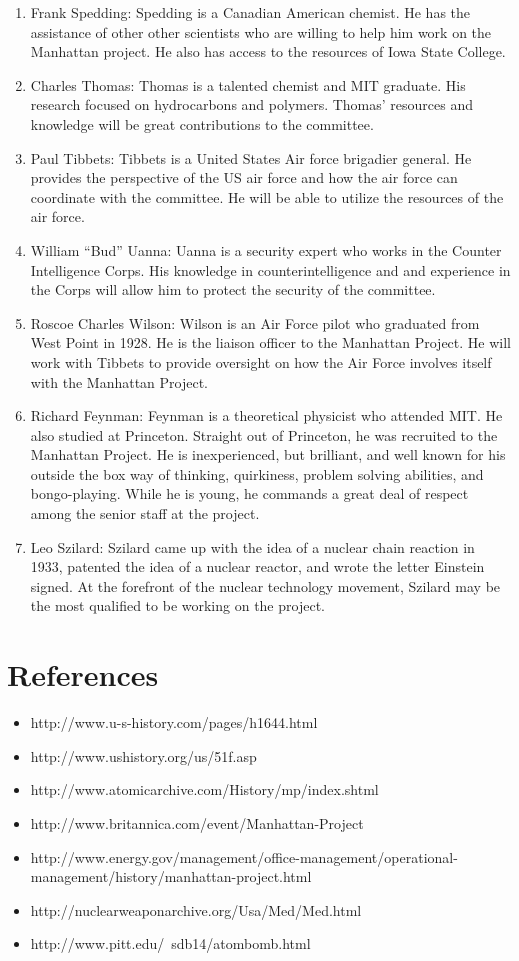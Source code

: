 \documentclass[11 pt, twoside]{article}
\begin{document}
\begin{enumerate}
\item Frank Spedding: Spedding is a Canadian American chemist. He has the assistance of other other scientists who are willing to help him work on the Manhattan project. He also has access to the resources of Iowa State College.
\item Charles Thomas: Thomas is a talented chemist and MIT graduate. His research focused on hydrocarbons and polymers. Thomas’ resources and knowledge will be great contributions to the committee. 
\item Paul Tibbets: Tibbets is a United States Air force brigadier general. He provides the perspective of the US air force and how the air force can coordinate with the committee. He will be able to utilize the resources of the air force.
\item William “Bud” Uanna: Uanna is a security expert who works in the Counter Intelligence Corps. His knowledge in counterintelligence and and experience in the Corps will allow him to protect the security of the committee.
\item Roscoe Charles Wilson: Wilson is an Air Force pilot who graduated from West Point in 1928. He is the liaison officer to the Manhattan Project. He will work with Tibbets to provide oversight on how the Air Force involves itself with the Manhattan Project. 
\item Richard Feynman: Feynman is a theoretical physicist who attended MIT. He also studied at Princeton. Straight out of Princeton, he was recruited to the Manhattan Project. He is inexperienced, but brilliant, and well known for his outside the box way of thinking, quirkiness, problem solving abilities, and bongo-playing. While he is young, he commands a great deal of respect among the senior staff at the project. 
\item Leo Szilard: Szilard came up with the idea of a nuclear chain reaction in 1933, patented the idea of a nuclear reactor, and wrote the letter Einstein signed. At the forefront of the nuclear technology movement, Szilard may be the most qualified to be working on the project.
\end{enumerate}

\section{References}
\begin{itemize}
\item http://www.u-s-history.com/pages/h1644.html 
\item http://www.ushistory.org/us/51f.asp 
\item http://www.atomicarchive.com/History/mp/index.shtml 
\item http://www.britannica.com/event/Manhattan-Project 
\item http://www.energy.gov/management/office-management/operational-management/history/manhattan-project.html
\item http://nuclearweaponarchive.org/Usa/Med/Med.html 
\item http://www.pitt.edu/~sdb14/atombomb.html 
\end{itemize}
\end{document}
